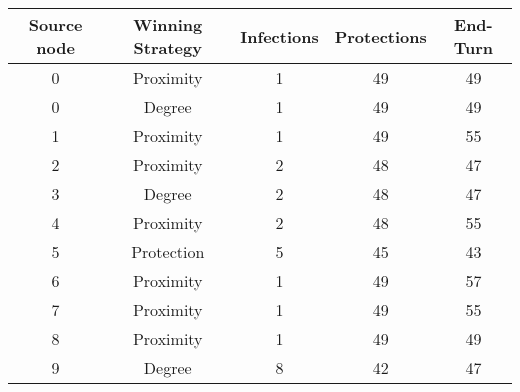 \documentclass[results.tex]{subfiles}
\begin{document}
    \begin{center}
        \begin{tabular}{| c || c | c | c | c |}
            \hline
            {\bfseries Source node} & {\bfseries Winning Strategy} & {\bfseries Infections} & {\bfseries Protections}
            & {\bfseries End-Turn}
            \\  %
            \hline\hline
            0                       & Proximity                    & 1                      & 49                      & 49                   \\
            \hline
            0                       & Degree                       & 1                      & 49                      & 49                   \\
            \hline
            1                       & Proximity                    & 1                      & 49                      & 55                   \\
            \hline
            2                       & Proximity                    & 2                      & 48                      & 47                   \\
            \hline
            3                       & Degree                       & 2                      & 48                      & 47                   \\
            \hline
            4                       & Proximity                    & 2                      & 48                      & 55                   \\
            \hline
            5                       & Protection                   & 5                      & 45                      & 43                   \\
            \hline
            6                       & Proximity                    & 1                      & 49                      & 57                   \\
            \hline
            7                       & Proximity                    & 1                      & 49                      & 55                   \\
            \hline
            8                       & Proximity                    & 1                      & 49                      & 49                   \\
            \hline
            9                       & Degree                       & 8                      & 42                      & 47                   \\

\end{tabular}
\end{center}
\end{document}
